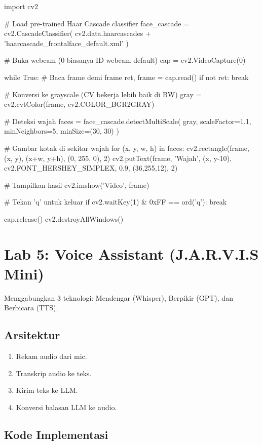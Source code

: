 \begin{codeblock}[language=Python]
import cv2

# Load pre-trained Haar Cascade classifier
face_cascade = cv2.CascadeClassifier(
    cv2.data.haarcascades + 'haarcascade_frontalface_default.xml'
)

# Buka webcam (0 biasanya ID webcam default)
cap = cv2.VideoCapture(0)

while True:
    # Baca frame demi frame
    ret, frame = cap.read()
    if not ret:
        break

    # Konversi ke grayscale (CV bekerja lebih baik di BW)
    gray = cv2.cvtColor(frame, cv2.COLOR_BGR2GRAY)

    # Deteksi wajah
    faces = face_cascade.detectMultiScale(
        gray,
        scaleFactor=1.1,
        minNeighbors=5,
        minSize=(30, 30)
    )

    # Gambar kotak di sekitar wajah
    for (x, y, w, h) in faces:
        cv2.rectangle(frame, (x, y), (x+w, y+h), (0, 255, 0), 2)
        cv2.putText(frame, 'Wajah', (x, y-10),
                   cv2.FONT_HERSHEY_SIMPLEX, 0.9, (36,255,12), 2)

    # Tampilkan hasil
    cv2.imshow('Video', frame)

    # Tekan 'q' untuk keluar
    if cv2.waitKey(1) & 0xFF == ord('q'):
        break

cap.release()
cv2.destroyAllWindows()
\end{codeblock}

\chapter{Lab 5: Voice Assistant (J.A.R.V.I.S Mini)}
\label{chap:lab5}

Menggabungkan 3 teknologi: Mendengar (Whisper), Berpikir (GPT), dan Berbicara (TTS).

\section{Arsitektur}
\begin{enumerate}
    \item Rekam audio dari mic.
    \item Transkrip audio ke teks.
    \item Kirim teks ke LLM.
    \item Konversi balasan LLM ke audio.
\end{enumerate}

\section{Kode Implementasi}

